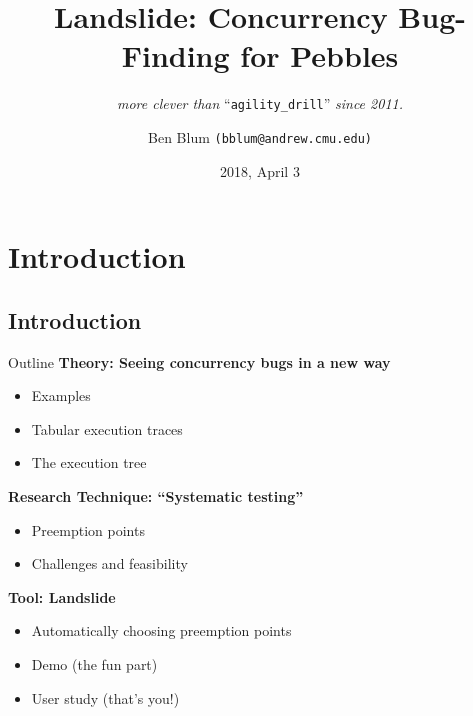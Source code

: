 \documentclass[xcolor=dvipsnames]{beamer}
\title[Landslide]{{\bf Landslide: Concurrency Bug-Finding for Pebbles}}
\subtitle[]{ {\em more clever than } ``\texttt{agility\_drill}'' {\em since 2011.}}
\author[Ben Blum]{Ben Blum \texttt{(bblum@andrew.cmu.edu)}}
\institute[PSU \classname]{Penn State University - \classname}
\date[]{2018, April 3}
\begin{document}
\renewcommand{\inserttotalframenumber}{42}
\normalem
\begin{frame}
	\titlepage
\end{frame}


\newcommand\linegap{\vspace{0.2in}}
\newcommand\breakslide[1]{\begin{frame}{} \begin{center} #1 \end{center} \end{frame}}

\section{Introduction}
\subsection{Introduction}

\begin{frame}{Outline}
	\textbf{Theory: Seeing concurrency bugs in a new way}
	\begin{itemize}
		\item Examples
		\item Tabular execution traces
		\item The execution tree
	\end{itemize}
	{\bf Research Technique: ``Systematic testing''}
	\begin{itemize}
		\item Preemption points
		\item Challenges and feasibility
	\end{itemize}
	{\bf Tool: Landslide}
	\begin{itemize}
		\item Automatically choosing preemption points
		\item Demo (the fun part)
		\item User study (that's you!)
	\end{itemize}
\end{frame}
\end{document}
